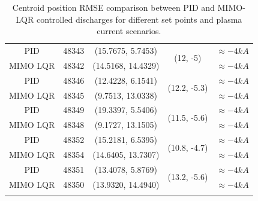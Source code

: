 \begin{center}
\begin{longtable}{||c| c| c| c|c||}
		\hline
		PID & 48343 &(15.7675,	5.7453)   & \multirow{ 2}{*}{(12, -5)}&  $\approx -4 kA$  \\ 
		\cline{1-3} \cline{5-5}
		MIMO LQR & 48342 & (14.5168,	14.4329) & &  $\approx -4 kA$  \\
		\hline
		PID & 48346 & (12.4228,	6.1541)  & \multirow{ 2}{*}{(12.2, -5.3)}& $\approx -4 kA$\\ 
		\cline{1-3} \cline{5-5}
		MIMO LQR & 48345 & (9.7513,	13.0338) & & $\approx -4 kA$ \\
		\hline
		PID & 48349 & (19.3397,	5.5406)  & \multirow{ 2}{*}{(11.5, -5.6)}&$\approx -4 kA$  \\ 
		\cline{1-3} \cline{5-5}
		MIMO LQR & 48348 & (9.1727,	13.1505) & &$\approx -4 kA$  \\
		\hline
		PID & 48352 &  (15.2181,	6.5395) & \multirow{ 2}{*}{(10.8, -4.7)} &$\approx -4 kA$ \\ 
		\cline{1-3} \cline{5-5}
		MIMO LQR & 48354 & (14.6405,	13.7307) & & $\approx -4 kA$ \\
		\hline
		PID & 48351 &  (13.4078, 5.8769) & \multirow{ 2}{*}{(13.2, -5.6)}& $\approx -4 kA$ \\ 
		\cline{1-3} \cline{5-5} 
		MIMO LQR & 48350 & (13.9320,	14.4940) & &$\approx -4 kA$  \\
		\hline 
		\caption{Centroid position RMSE comparison between PID and MIMO-LQR controlled discharges for different set points and plasma current scenarios.}
	\end{longtable}
	\label{TableControl}
	
\end{center}

